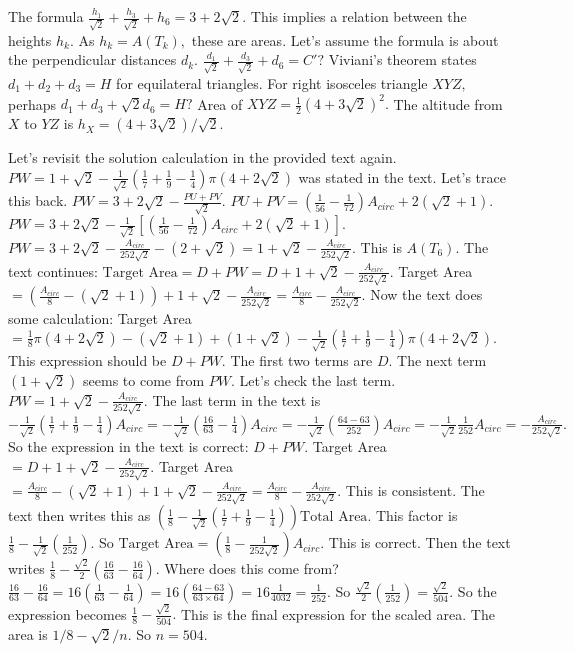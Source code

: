The formula $\frac{h_1}{\sqrt{2}} + \frac{h_3}{\sqrt{2}} + h_6 = 3+2\sqrt{2}.$ This implies a relation between the heights $h_k.$ As $h_k=A(T_k),$ these are areas. 
Let's assume the formula is about the perpendicular distances $d_k.$ $\frac{d_1}{\sqrt{2}} + \frac{d_3}{\sqrt{2}} + d_6 = C'?$ 
Viviani's theorem states $d_1+d_2+d_3 = H$ for equilateral triangles. For right isosceles triangle $XYZ,$ perhaps $d_1+d_3+\sqrt{2}d_6=H?$ Area of $XYZ = \frac{1}{2} (4+3\sqrt{2})^2.$ The altitude from $X$ to $YZ$ is $h_X = (4+3\sqrt{2})/\sqrt{2}.$

Let's revisit the solution calculation in the provided text again. 
$PW = 1+\sqrt{2}- \frac{1}{\sqrt{2}}\left(\frac{1}{7}+\frac{1}{9}-\frac{1}{4}\right)\pi\left(4+2\sqrt{2}\right)$ was stated in the text. Let's trace this back. 
$PW = 3+2\sqrt{2} - \frac{PU+PV}{\sqrt{2}}.$ 
$PU+PV = (\frac{1}{56}-\frac{1}{72}) A_{circ} + 2(\sqrt{2}+1).$ 
$PW = 3+2\sqrt{2} - \frac{1}{\sqrt{2}} [ (\frac{1}{56}-\frac{1}{72}) A_{circ} + 2(\sqrt{2}+1) ].$ 
$PW = 3+2\sqrt{2} - \frac{A_{circ}}{252\sqrt{2}} - (2+\sqrt{2}) = 1+\sqrt{2} - \frac{A_{circ}}{252\sqrt{2}}.$ This is $A(T_6).$ 
The text continues: $\text{Target Area} = D + PW = D + 1+\sqrt{2} - \frac{A_{circ}}{252\sqrt{2}}.$ 
Target Area $= (\frac{A_{circ}}{8} - (\sqrt{2}+1)) + 1+\sqrt{2} - \frac{A_{circ}}{252\sqrt{2}} = \frac{A_{circ}}{8} - \frac{A_{circ}}{252\sqrt{2}}.$ 
Now the text does some calculation: 
Target Area $= \frac{1}{8} \pi(4+2\sqrt{2}) - (\sqrt{2}+1) + (1+\sqrt{2}) - \frac{1}{\sqrt{2}}(\frac{1}{7}+\frac{1}{9}-\frac{1}{4}) \pi(4+2\sqrt{2}).$ 
This expression should be $D+PW.$ 
The first two terms are $D.$ The next term $(1+\sqrt{2})$ seems to come from $PW.$ Let's check the last term. 
$PW = 1+\sqrt{2} - \frac{A_{circ}}{252\sqrt{2}}.$ 
The last term in the text is $-\frac{1}{\sqrt{2}}(\frac{1}{7}+\frac{1}{9}-\frac{1}{4}) A_{circ} = -\frac{1}{\sqrt{2}}(\frac{16}{63}-\frac{1}{4}) A_{circ} = -\frac{1}{\sqrt{2}}(\frac{64-63}{252}) A_{circ} = -\frac{1}{\sqrt{2}} \frac{1}{252} A_{circ} = -\frac{A_{circ}}{252\sqrt{2}}.$ 
So the expression in the text is correct: $D + PW.$ 
Target Area $= D + 1+\sqrt{2} - \frac{A_{circ}}{252\sqrt{2}}.$ 
Target Area $= \frac{A_{circ}}{8} - (\sqrt{2}+1) + 1+\sqrt{2} - \frac{A_{circ}}{252\sqrt{2}} = \frac{A_{circ}}{8} - \frac{A_{circ}}{252\sqrt{2}}.$ 
This is consistent. 
The text then writes this as $(\frac{1}{8} - \frac{1}{\sqrt{2}}(\frac{1}{7}+\frac{1}{9}-\frac{1}{4})) \text{Total Area}.$ 
This factor is $\frac{1}{8} - \frac{1}{\sqrt{2}}(\frac{1}{252}).$ So $\text{Target Area} = (\frac{1}{8} - \frac{1}{252\sqrt{2}}) A_{circ}.$ 
This is correct. 
Then the text writes $\frac{1}{8}- \frac{\sqrt{2}}{2}\left(\frac{16}{63}-\frac{16}{64}\right).$ Where does this come from? 
$\frac{16}{63}-\frac{16}{64} = 16(\frac{1}{63}-\frac{1}{64}) = 16(\frac{64-63}{63 \times 64}) = 16 \frac{1}{4032} = \frac{1}{252}.$ 
So $\frac{\sqrt{2}}{2}(\frac{1}{252}) = \frac{\sqrt{2}}{504}.$ 
So the expression becomes $\frac{1}{8} - \frac{\sqrt{2}}{504}.$ 
This is the final expression for the scaled area. The area is $1/8 - \sqrt{2}/n.$ So $n=504.$

